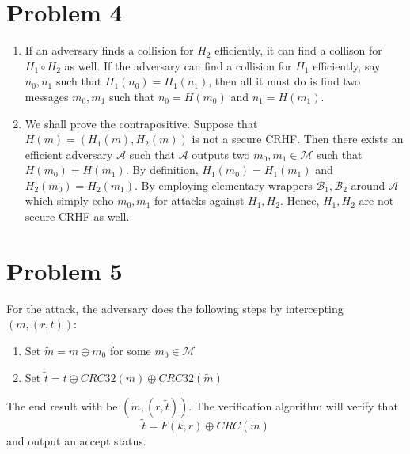 \documentclass[11pt]{article}
\begin{document}
\section*{Problem 4}
\begin{enumerate}
  \item If an adversary finds a collision for $H_2$ efficiently, it can find a collison for $H_1 \circ H_2$ as well. If the adversary can find a collision for $H_1$ efficiently, say $n_0, n_1$ such that $H_1(n_0) = H_1(n_1)$, then all it must do is find two messages $m_0, m_1$ such that $n_0 = H(m_0)$ and $n_1 = H(m_1)$.
  \item We shall prove the contrapositive. Suppose that $H(m) = (H_1(m), H_2(m))$ is not a secure CRHF. Then there exists an efficient adversary $\mathcal{A}$ such that $\mathcal{A}$ outputs two $m_0, m_1 \in \mathcal{M}$ such that $H(m_0) = H(m_1)$. By definition, $H_1(m_0) = H_1(m_1)$ and $H_2(m_0) = H_2(m_1)$. By employing elementary wrappers $\mathcal{B}_1, \mathcal{B}_2$ around $\mathcal{A}$ which simply echo $m_0,m_1$ for attacks against $H_1,H_2$. Hence, $H_1, H_2$ are not secure CRHF as well.
\end{enumerate}

\section*{Problem 5}
For the attack, the adversary does the following steps by intercepting $(m, (r,t))$:
\begin{enumerate}
  \item Set $\tilde{m} = m \oplus m_0$ for some $m_0 \in \mathcal{M}$
  \item Set $\tilde{t} = t \oplus CRC32(m) \oplus CRC32(\tilde{m})$
 \end{enumerate}

 The end result with be $(\tilde{m}, (r, \tilde{t}))$. The verification algorithm will verify that
 \[ \tilde{t} = F(k,r) \oplus CRC(\tilde{m}) \] and output an accept status.
\end{document}
